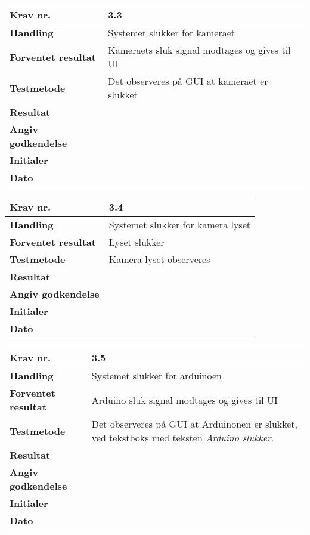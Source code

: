 	\begin{center}
		\begin{longtable}{ | m{4cm}| m{8.5cm}|} 
			\hline
			\textbf{Krav nr.} & 3.3  \\ 
			\hline
			\textbf{Handling} & Systemet slukker for kameraet  \\
			\hline
			\textbf{Forventet resultat} & Kameraets sluk signal modtages og gives til UI \\
			\hline
			\textbf{Testmetode}  & Det observeres på GUI at kameraet er slukket  \\
			\hline
			\textbf{Resultat}  &    \\
			\hline
			\textbf{Angiv godkendelse} &     \\
			\hline
			\textbf{Initialer} &     \\
			\hline
			\textbf{Dato} &    \\
			\hline
		\end{longtable}
	\end{center}			
		
\newpage		
			
	\begin{center}
		\begin{longtable}{ | m{4cm}| m{8.5cm}|} 
			\hline
			\textbf{Krav nr.} & 3.4  \\ 
			\hline
			\textbf{Handling} & Systemet slukker for kamera lyset   \\
			\hline
			\textbf{Forventet resultat} & Lyset slukker \\
			\hline
			\textbf{Testmetode}  & Kamera lyset observeres  \\
			\hline
			\textbf{Resultat}  &    \\
			\hline
			\textbf{Angiv godkendelse} &     \\
			\hline
			\textbf{Initialer} &     \\
			\hline
			\textbf{Dato} &    \\
			\hline
		\end{longtable}
	\end{center}
			
	\begin{center}
		\begin{longtable}{ | m{4cm}| m{8.5cm}|} 
			\hline
			\textbf{Krav nr.} & 3.5  \\ 
			\hline
			\textbf{Handling} & Systemet slukker for arduinoen   \\
			\hline
			\textbf{Forventet resultat} & Arduino sluk signal modtages og gives til UI \\
			\hline
			\textbf{Testmetode}  & Det observeres på GUI at Arduinonen er slukket, ved tekstboks med teksten \textit{Arduino slukker}.  \\
			\hline
			\textbf{Resultat}  &    \\
			\hline
			\textbf{Angiv godkendelse} &     \\
			\hline
			\textbf{Initialer} &     \\
			\hline
			\textbf{Dato} &    \\
			\hline
		\end{longtable}
	\end{center}
					
